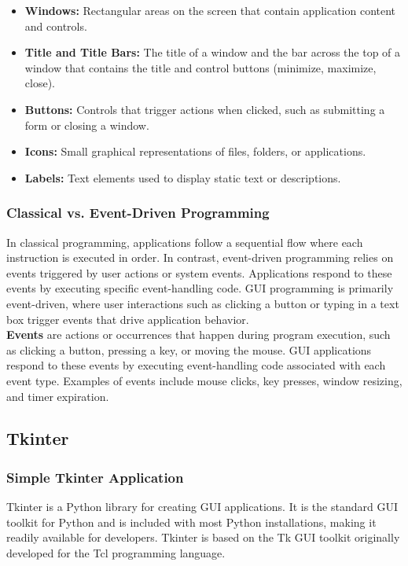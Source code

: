 \begin{itemize}
    \item \textbf{Windows:} Rectangular areas on the screen that contain application content and controls.
    \item \textbf{Title and Title Bars:} The title of a window and the bar across the top of a window that contains the title and control buttons (minimize, maximize, close).
    \item \textbf{Buttons:} Controls that trigger actions when clicked, such as submitting a form or closing a window.
    \item \textbf{Icons:} Small graphical representations of files, folders, or applications.
    \item \textbf{Labels:} Text elements used to display static text or descriptions.
\end{itemize}

\subsubsection{Classical vs. Event-Driven Programming}
In classical programming, applications follow a sequential flow where each instruction is executed in order. In contrast, event-driven programming relies on events triggered by user actions or system events. Applications respond to these events by executing specific event-handling code. GUI programming is primarily event-driven, where user interactions such as clicking a button or typing in a text box trigger events that drive application behavior.\\

\textbf{Events} are actions or occurrences that happen during program execution, such as clicking a button, pressing a key, or moving the mouse. GUI applications respond to these events by executing event-handling code associated with each event type. Examples of events include mouse clicks, key presses, window resizing, and timer expiration.

\subsection{Tkinter}

\subsubsection{Simple Tkinter Application}
Tkinter is a Python library for creating GUI applications. It is the standard GUI toolkit for Python and is included with most Python installations, making it readily available for developers. Tkinter is based on the Tk GUI toolkit originally developed for the Tcl programming language.

